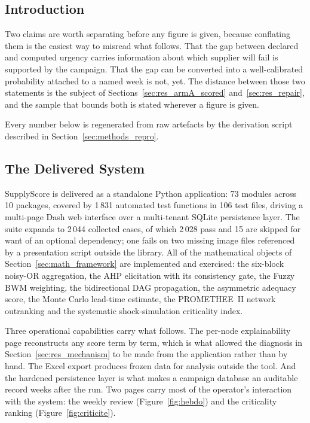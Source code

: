 \subsection{Introduction}
\label{sec:res_intro}

Two claims are worth separating before any figure is given, because conflating them is the
easiest way to misread what follows. That the gap between declared and computed urgency
carries information about which supplier will fail is supported by the campaign. That the gap
can be converted into a well-calibrated probability attached to a named week is not, yet. The
distance between those two statements is the subject of
Sections~\ref{sec:res_armA_scored} and~\ref{sec:res_repair}, and the sample that bounds both
is stated wherever a figure is given.

Every number below is regenerated from raw artefacts by the derivation script described in
Section~\ref{sec:methods_repro}.

\subsection{The Delivered System}
\label{sec:res_system}

SupplyScore is delivered as a standalone Python application: 73 modules across 10 packages,
covered by 1\,831 automated test functions in 106 test files, driving a multi-page Dash web
interface over a multi-tenant SQLite persistence layer. The suite expands to 2\,044 collected
cases, of which 2\,028 pass and 15 are skipped for want of an optional dependency; one fails
on two missing image files referenced by a presentation script outside the library. All of the mathematical objects of
Section~\ref{sec:math_framework} are implemented and exercised: the six-block noisy-OR
aggregation, the AHP elicitation with its consistency gate, the Fuzzy BWM weighting, the
bidirectional DAG propagation, the asymmetric adequacy score, the Monte Carlo lead-time
estimate, the PROMETHEE~II network outranking and the systematic shock-simulation
criticality index.

Three operational capabilities carry what follows. The per-node explainability page
reconstructs any score term by term, which is what allowed the diagnosis in
Section~\ref{sec:res_mechanism} to be made from the application rather than by hand. The Excel
export produces frozen data for analysis outside the tool. And the hardened persistence layer
is what makes a campaign database an auditable record weeks after the run. Two pages carry
most of the operator's interaction with the system: the weekly review
(Figure~\ref{fig:hebdo}) and the criticality ranking (Figure~\ref{fig:criticite}).

